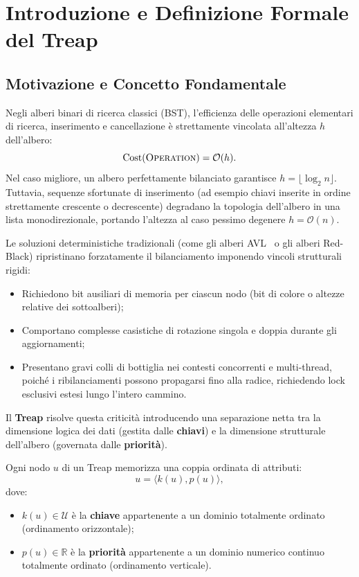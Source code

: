 \FloatBarrier
\section{Introduzione e Definizione Formale del Treap}
\label{sec:treap-definition-and-foundations}

\subsection{Motivazione e Concetto Fondamentale}
Negli alberi binari di ricerca classici (BST), l'efficienza delle operazioni elementari di ricerca, inserimento e cancellazione \`e strettamente vincolata all'altezza $h$ dell'albero:
\begin{equation}
  \operatorname{Cost}(\textsc{Operation}) = \mathcal{O}(h).
\end{equation}
Nel caso migliore, un albero perfettamente bilanciato garantisce $h = \lfloor \log_2 n \rfloor$. Tuttavia, sequenze sfortunate di inserimento (ad esempio chiavi inserite in ordine strettamente crescente o decrescente) degradano la topologia dell'albero in una lista monodirezionale, portando l'altezza al caso pessimo degenere $h = \mathcal{O}(n)$.

Le soluzioni deterministiche tradizionali (come gli alberi AVL~\cite{knuth1997} o gli alberi Red-Black) ripristinano forzatamente il bilanciamento imponendo vincoli strutturali rigidi:
\begin{itemize}
    \item Richiedono bit ausiliari di memoria per ciascun nodo (bit di colore o altezze relative dei sottoalberi);
    \item Comportano complesse casistiche di rotazione singola e doppia durante gli aggiornamenti;
    \item Presentano gravi colli di bottiglia nei contesti concorrenti e multi-thread, poich\'e i ribilanciamenti possono propagarsi fino alla radice, richiedendo lock esclusivi estesi lungo l'intero cammino.
\end{itemize}

Il \textbf{Treap} risolve questa criticit\`a introducendo una separazione netta tra la dimensione logica dei dati (gestita dalle \textbf{chiavi}) e la dimensione strutturale dell'albero (governata dalle \textbf{priorit\`a}).

\begin{definition}
Ogni nodo $u$ di un Treap memorizza una coppia ordinata di attributi:
\begin{equation}
  u = \langle k(u), p(u) \rangle,
\end{equation}
dove:
\begin{itemize}
    \item $k(u) \in \mathcal{U}$ \`e la \textbf{chiave} appartenente a un dominio totalmente ordinato (ordinamento orizzontale);
    \item $p(u) \in \mathbb{R}$ \`e la \textbf{priorit\`a} appartenente a un dominio numerico continuo totalmente ordinato (ordinamento verticale).
\end{itemize}
\end{definition}

